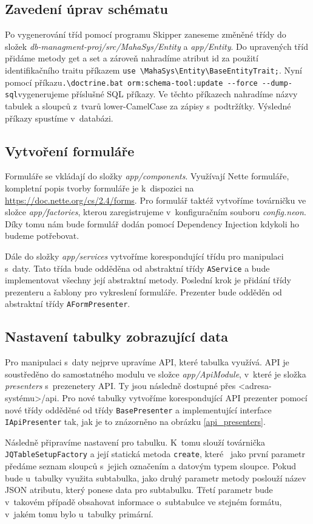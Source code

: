 \documentclass[thesis=B,czech]{FITthesis}[2012/06/26]
\begin{document}
\subsection{Zavedení úprav schématu}
	Po vygenerování tříd pomocí programu Skipper zaneseme změněné třídy do složek \emph{db-managment-proj/src/MahaSys/Entity} a \emph{app/Entity}. Do upravených tříd přidáme metody get a set a zároveň nahradíme atribut id za použití identifikačního traitu příkazem \verb|use \MahaSys\Entity\BaseEntityTrait;|. Nyní pomocí příkazu\newline\verb|.\doctrine.bat orm:schema-tool:update --force --dump-sql|\newline vygenerujeme příslušné SQL příkazy. Ve těchto příkazech nahradíme názvy tabulek a sloupců z~tvarů lower-CamelCase za zápisy s~podtržítky. Výsledné příkazy spustíme v~databázi.
\subsection{Vytvoření formuláře}
	Formuláře se vkládají do složky \emph{app/components}. Využívají Nette formuláře, kompletní popis tvorby formuláře je k~dispozici na \url{https://doc.nette.org/cs/2.4/forms}. Pro formulář taktéž vytvoříme továrničku ve složce \emph{app/factories}, kterou zaregistrujeme v~konfiguračním souboru \emph{config.neon}. Díky tomu nám bude formulář dodán pomocí Dependency Injection kdykoli ho budeme potřebovat. 

	Dále do složky \emph{app/services} vytvoříme korespondující třídu pro manipulaci s~daty. Tato třída bude odděděna od abstraktní třídy \verb|AService| a bude implementovat všechny její abstraktní metody. Poslední krok je přidání třídy prezenteru a šablony pro vykreslení formuláře. Prezenter bude odděděn od abstraktní třídy \verb|AFormPresenter|.
\subsection{Nastavení tabulky zobrazující data}
	Pro manipulaci s~daty nejprve upravíme API, které tabulka využívá. API je soustředěno do samostatného modulu ve složce \emph{app/ApiModule}, v~které je složka \emph{presenters} s~prezenetery API. Ty jsou následně dostupné přes <adresa-systému>/api. Pro nové tabulky vytvoříme korespondující API prezenter pomocí nové třídy odděděné od třídy \verb|BasePresenter| a implementující interface \verb|IApiPresenter| tak, jak je to znázorněno na obrázku \ref{api_presenters}. 

	Následně připravíme nastavení pro tabulku. K~tomu slouží továrnička \verb|JQTableSetupFactory| a její statická metoda \verb|create|, které ~jako první parametr předáme seznam sloupců s~jejich označením a datovým typem sloupce. Pokud bude u~tabulky využita subtabulka, jako druhý parametr metody poslouží název JSON atributu, který ponese data pro subtabulku. Třetí parametr bude v~takovém případě obsahovat informace o~subtabulce ve stejném formátu, v~jakém tomu bylo u~tabulky primární.
\end{document}

